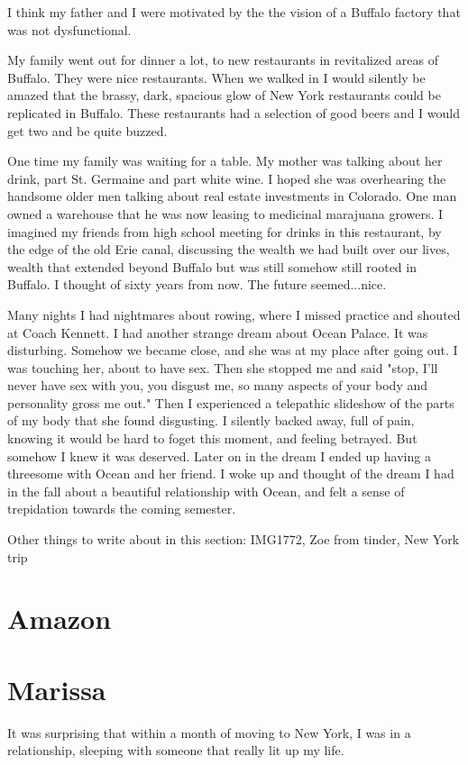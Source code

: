 \documentclass[12pt]{article}
\begin{document}
I think my father and I were motivated by the the vision of a Buffalo factory
that was not dysfunctional. 

My family went out for dinner a lot, to new restaurants in revitalized areas of
Buffalo.  They were nice restaurants.  When we walked in I would silently be
amazed that the brassy, dark, spacious glow of New York restaurants could be
replicated in Buffalo.  These restaurants had a selection of good beers and I
would get two and be quite buzzed.

One time my family was waiting for a table.  My mother was talking about
her drink, part St. Germaine and part white wine.  I hoped she was overhearing
the handsome older men talking about real estate investments in Colorado.  One
man owned a warehouse that he was now leasing to medicinal marajuana growers.  I
imagined my friends from high school meeting for drinks in this restaurant, by
the edge of the old Erie canal, discussing the wealth we had built over our
lives, wealth that extended beyond Buffalo but was still somehow still rooted in
Buffalo.  I thought of sixty years from now.  The future seemed...nice.

Many nights I had nightmares about rowing, where I missed practice and shouted
at Coach Kennett.  I had another strange dream about Ocean Palace.  It was
disturbing.  Somehow we became close, and she was at my place after going out.
I was touching her, about to have sex.  Then she stopped me and said "stop, I'll
never have sex with you, you disgust me, so many aspects of your body and
personality gross me out."  Then I experienced a telepathic slideshow of the
parts of my body that she found disgusting.  I silently backed away, full of
pain, knowing it would be hard to foget this moment, and feeling betrayed. But
somehow I knew it was deserved.  Later on in the dream I ended up having a
threesome with Ocean and her friend.  I woke up and thought of the dream I had
in the fall about a beautiful relationship with Ocean, and felt a sense of
trepidation towards the coming semester.

Other things to write about in this section: IMG1772, Zoe from tinder, New York
trip

\section{Amazon}

\section{Marissa}
It was surprising that within a month of moving to New York, I was in a
relationship, sleeping with someone that really lit up my life.
\end{document}
